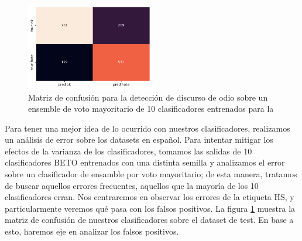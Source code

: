 
\begin{figure}[t]
    \centering
    \includegraphics[width=0.5\textwidth]{img/hateval_confusion_matrix.pdf}
    \caption{Matriz de confusión para la detección de discurso de odio sobre un ensemble de voto mayoritario de 10 clasificadores entrenados para la \subtaskb{}}
    \label{fig:hateval_error_analysis}
\end{figure}


Para tener una mejor idea de lo ocurrido con nuestros clasificadores, realizamos un análisis de error sobre los datasets en español. Para intentar mitigar los efectos de la varianza de los clasificadores, tomamos las salidas de 10 clasificadores BETO entrenados con una distinta semilla y analizamos el error sobre un clasificador de ensamble por voto mayoritario; de esta manera, tratamos de buscar aquellos errores frecuentes, aquellos que la mayoría de los 10 clasificadores erran. Nos centraremos en observar los errores de la etiqueta HS, y particularmente veremos qué pasa con los falsos positivos. La figura \ref{fig:hateval_error_analysis} muestra la matriz de confusión de nuestros clasificadores sobre el dataset de test. En base a esto, haremos eje en analizar los falsos positivos.


